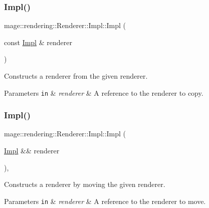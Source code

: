 \subsubsection{\texorpdfstring{Impl()}{Impl()}\hspace{0.1cm}{\footnotesize\ttfamily [2/3]}}
{\footnotesize\ttfamily mage\+::rendering\+::\+Renderer\+::\+Impl\+::\+Impl (\begin{DoxyParamCaption}\item[{const \hyperlink{classmage_1_1rendering_1_1_renderer_1_1_impl}{Impl} \&}]{renderer }\end{DoxyParamCaption})\hspace{0.3cm}{\ttfamily [delete]}}

Constructs a renderer from the given renderer.


\begin{DoxyParams}[1]{Parameters}
\mbox{\tt in}  & {\em renderer} & A reference to the renderer to copy. \\
\hline
\end{DoxyParams}
\hypertarget{classmage_1_1rendering_1_1_renderer_1_1_impl_abc02d1958ce940e8b13d4fe3de3fd05f}{}\label{classmage_1_1rendering_1_1_renderer_1_1_impl_abc02d1958ce940e8b13d4fe3de3fd05f} 
\subsubsection{\texorpdfstring{Impl()}{Impl()}\hspace{0.1cm}{\footnotesize\ttfamily [3/3]}}
{\footnotesize\ttfamily mage\+::rendering\+::\+Renderer\+::\+Impl\+::\+Impl (\begin{DoxyParamCaption}\item[{\hyperlink{classmage_1_1rendering_1_1_renderer_1_1_impl}{Impl} \&\&}]{renderer }\end{DoxyParamCaption})\hspace{0.3cm}{\ttfamily [default]}, {\ttfamily [noexcept]}}

Constructs a renderer by moving the given renderer.


\begin{DoxyParams}[1]{Parameters}
\mbox{\tt in}  & {\em renderer} & A reference to the renderer to move. \\
\hline
\end{DoxyParams}
\hypertarget{classmage_1_1rendering_1_1_renderer_1_1_impl_a80064673490a87b9f3cd567e56d3de8f}{}\label{classmage_1_1rendering_1_1_renderer_1_1_impl_a80064673490a87b9f3cd567e56d3de8f} 
